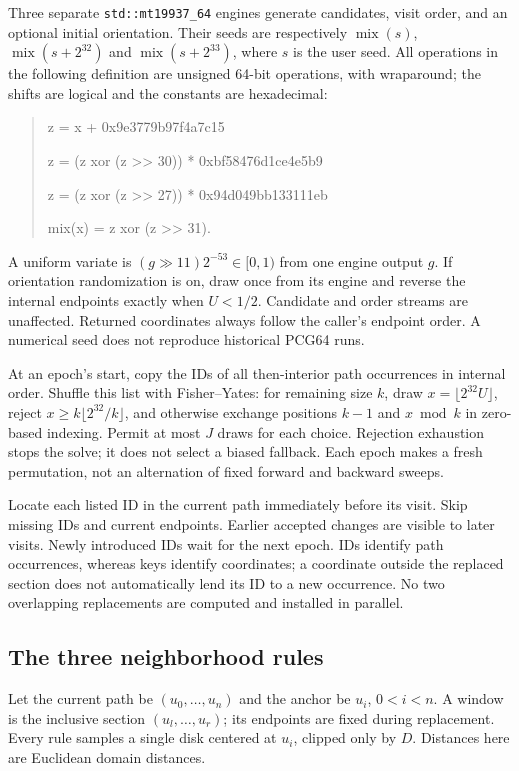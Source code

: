 \documentclass[11pt,letterpaper]{article}
\newcommand{\src}[1]{\nolinkurl{#1}}
\begin{document}
Three separate \src{std::mt19937_64} engines generate candidates, visit order,
and an optional initial orientation. Their seeds are respectively
$\operatorname{mix}(s)$, $\operatorname{mix}(s+2^{32})$ and
$\operatorname{mix}(s+2^{33})$, where $s$ is the user seed. All operations
in the following definition are unsigned 64-bit operations, with wraparound;
the shifts are logical and the constants are hexadecimal:
\begin{quote}\small\ttfamily
z = x + 0x9e3779b97f4a7c15\par
z = (z xor (z >> 30)) * 0xbf58476d1ce4e5b9\par
z = (z xor (z >> 27)) * 0x94d049bb133111eb\par
mix(x) = z xor (z >> 31).
\end{quote}
A uniform variate is $(g\mathbin{\gg}11)2^{-53}\in[0,1)$ from one engine
output $g$. If orientation randomization is on, draw once from its engine
and reverse the internal endpoints exactly when $U<1/2$. Candidate and
order streams are unaffected. Returned coordinates always follow the caller's
endpoint order. A numerical seed does not reproduce historical PCG64 runs.

At an epoch's start, copy the IDs of all then-interior path occurrences in
internal order. Shuffle this list with Fisher--Yates: for remaining size
$k$, draw $x=\lfloor2^{32}U\rfloor$, reject
$x\ge k\lfloor2^{32}/k\rfloor$, and otherwise exchange positions $k-1$
and $x\bmod k$ in zero-based indexing. Permit at most $J$ draws for each
choice. Rejection exhaustion stops the solve; it does not select a biased
fallback. Each epoch makes a fresh permutation, not an alternation of fixed
forward and backward sweeps.

Locate each listed ID in the current path immediately before its visit.
Skip missing IDs and current endpoints. Earlier accepted changes are visible
to later visits. Newly introduced IDs wait for the next epoch. IDs identify
path occurrences, whereas keys identify coordinates; a coordinate outside
the replaced section does not automatically lend its ID to a new occurrence.
No two overlapping replacements are computed and installed in parallel.

\subsection{The three neighborhood rules}
\label{sec:cpp-neighborhoods}

Let the current path be $(u_0,\ldots,u_n)$ and the anchor be $u_i$,
$0<i<n$. A window is the inclusive section $(u_l,\ldots,u_r)$; its endpoints
are fixed during replacement. Every rule samples a single disk centered at
$u_i$, clipped only by $D$. Distances here are Euclidean domain distances.
\end{document}
